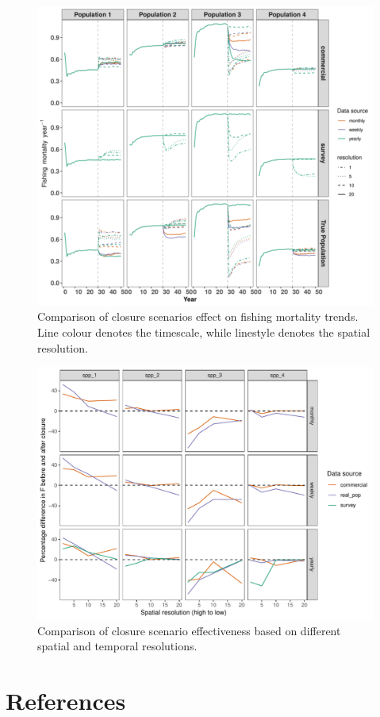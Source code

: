 \documentclass[review]{elsarticle}
\begin{document}
\begin{figure}[!ht]
	\includegraphics[width = \linewidth]{../analysis/F_trendsREV}
	\caption{Comparison of closure scenarios effect on fishing mortality
		trends. Line colour denotes the timescale, while linestyle
		denotes the spatial resolution.}
	\label{fig:3}
\end{figure}

\begin{figure}[!ht]
	\includegraphics[width =\linewidth]{../analysis/f_diff_effectiveness}
	\caption{Comparison of closure scenario effectiveness based on
		different spatial and temporal resolutions.}
	\label{fig:4}
\end{figure}	

\clearpage

\section*{References}


\end{document}
